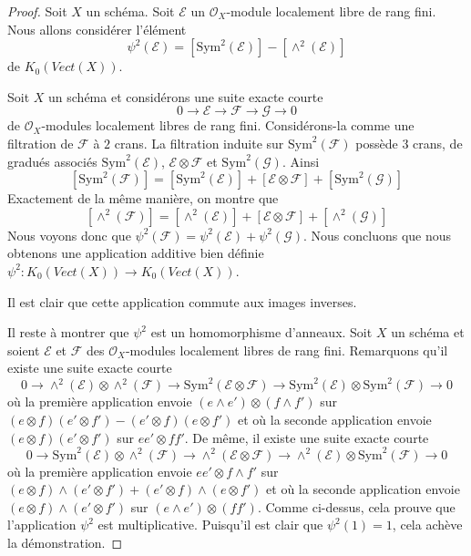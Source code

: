 \begin{proof}
Soit $X$ un schéma.
Soit $\mathcal{E}$ un $\mathcal{O}_X$-module localement libre de rang fini.
Nous allons considérer l'élément
$$
\psi^2(\mathcal{E}) = [\text{Sym}^2(\mathcal{E})] - [\wedge^2(\mathcal{E})]
$$
de $K_0(\textit{Vect}(X))$.

\medskip\noindent
Soit $X$ un schéma et considérons une suite exacte courte
$$
0 \to \mathcal{E} \to \mathcal{F} \to \mathcal{G} \to 0
$$
de $\mathcal{O}_X$-modules localement libres de rang fini. Considérons-la
comme une filtration de $\mathcal{F}$ à $2$ crans. La filtration
induite sur $\text{Sym}^2(\mathcal{F})$ possède $3$ crans, de
gradués associés $\text{Sym}^2(\mathcal{E})$, $\mathcal{E} \otimes \mathcal{F}$
et $\text{Sym}^2(\mathcal{G})$. Ainsi
$$
[\text{Sym}^2(\mathcal{F})] =
[\text{Sym}^2(\mathcal{E})] +
[\mathcal{E} \otimes \mathcal{F}] +
[\text{Sym}^2(\mathcal{G})]
$$
Exactement de la même manière, on montre que
$$
[\wedge^2(\mathcal{F})] =
[\wedge^2(\mathcal{E})] +
[\mathcal{E} \otimes \mathcal{F}] +
[\wedge^2(\mathcal{G})]
$$
Nous voyons donc que
$\psi^2(\mathcal{F}) = \psi^2(\mathcal{E}) + \psi^2(\mathcal{G})$.
Nous concluons que nous obtenons une application additive bien définie
$\psi^2 : K_0(\textit{Vect}(X)) \to K_0(\textit{Vect}(X))$.

\medskip\noindent
Il est clair que cette application commute aux images inverses.

\medskip\noindent
Il reste à montrer que $\psi^2$ est un homomorphisme d'anneaux.
Soit $X$ un schéma et soient $\mathcal{E}$ et $\mathcal{F}$ des
$\mathcal{O}_X$-modules localement libres de rang fini.
Remarquons qu'il existe une suite exacte courte
$$
0 \to \wedge^2(\mathcal{E}) \otimes \wedge^2(\mathcal{F}) \to
\text{Sym}^2(\mathcal{E} \otimes \mathcal{F}) \to
\text{Sym}^2(\mathcal{E}) \otimes \text{Sym}^2(\mathcal{F}) \to 0
$$
où la première application envoie $(e \wedge e') \otimes (f \wedge f')$ sur
$(e \otimes f)(e' \otimes f') - (e' \otimes f)(e \otimes f')$ et où
la seconde application envoie $(e \otimes f) (e' \otimes f')$ sur $ee' \otimes ff'$.
De même, il existe une suite exacte courte
$$
0 \to \text{Sym}^2(\mathcal{E}) \otimes \wedge^2(\mathcal{F}) \to
\wedge^2(\mathcal{E} \otimes \mathcal{F}) \to
\wedge^2(\mathcal{E}) \otimes \text{Sym}^2(\mathcal{F}) \to 0
$$
où la première application envoie $e e' \otimes f \wedge f'$ sur
$(e \otimes f) \wedge (e' \otimes f') + (e' \otimes f) \wedge (e \otimes f')$
et où la seconde application envoie
$(e \otimes f) \wedge (e' \otimes f')$ sur
$(e \wedge e') \otimes (f f')$.
Comme ci-dessus, cela prouve que l'application $\psi^2$ est multiplicative.
Puisqu'il est clair que $\psi^2(1) = 1$, cela achève la démonstration.
\end{proof}

